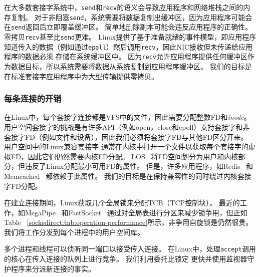 在大多数套接字系统中，\texttt {send}和\texttt {recv}的语义会导致应用程序和网络堆栈之间的内存复制。 对于非阻塞\texttt {send}，系统需要将数据复制出缓冲区，因为应用程序可能会在\texttt {send}返回后立即覆盖缓冲区。 简单地删除副本可能会违反应用程序的正确性。
零拷贝\texttt {recv}甚至比\texttt {send}更难。
Linux提供了基于准备就绪的事件模型，即应用程序知道传入的数据（例如通过\texttt {epoll}）然后调用\texttt {recv}，因此NIC接收但未传递给应用程序的数据必须 存储在系统缓冲区中。
因为\texttt {recv}允许应用程序提供任何缓冲区作为数据目标，所以系统需要将数据从系统复制到应用程序缓冲区。
我们的目标是在标准套接字应用程序中为大型传输提供零拷贝。



\subsubsection{每条连接的开销}
\label{socksdirect:subsec:per-connection-overhead}
\quad

在Linux中，每个套接字连接都是VFS中的文件，因此需要分配整数FD和\emph {inode}。
用户空间套接字的挑战是有许多API（例如open，close和epoll）支持套接字和非套接字FD（例如文件和设备），因此我们必须将套接字FD与其他FD区分开来。
用户空间中的Linux兼容套接字 \cite {libvma,rsockets}通常在内核中打开一个文件以获取每个套接字的虚拟FD，因此它们仍然需要内核FD分配。
LOS~ \cite {huang2017high}将FD空间划分为用户和内核部分，但违反了Linux分配最小可用FD的属性。
但是，许多应用程序，如Redis~ \cite {redis}和Memcached~ \cite {memcached}都依赖于此属性。
我们的目标是在保持兼容性的同时绕过内核套接字FD分配。

在建立连接期间，Linux获取几个全局锁来分配TCB（TCP控制块）。
最近的工作，如MegaPipe~ \cite {han2012megapipe}和FastSocket~ \cite {lin2016scalable}通过对全局表进行分区来减少锁争用，但正如Table~ \ref {socksdirect:tab:operation-performance}所示，非争用自旋锁是仍然很贵。
我们将工作分发到每个进程中的用户空间库\libipc {}。

多个进程和线程可以侦听同一端口以接受传入连接。
在Linux中，处理\texttt {accept}调用的核心在传入连接的队列上进行竞争。
我们利用委托比锁定 \cite {roghanchi2017ffwd}更快并使用监视器守护程序来分派新连接的事实。




